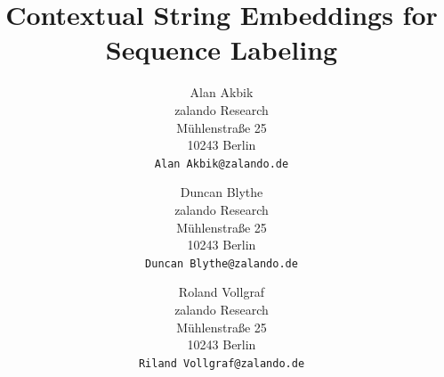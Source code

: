 \documentclass[10pt,twocolumn,letterpaper]{article}
\begin{document}
\title{Contextual String Embeddings for Sequence Labeling}
\author{Alan Akbik\\
zalando Research\\
Mühlenstraße 25\\
10243 Berlin\\
{\tt\small Alan Akbik@zalando.de}
\and
Duncan Blythe\\
zalando Research\\
Mühlenstraße 25\\
10243 Berlin\\
{\tt\small Duncan Blythe@zalando.de}
\and
Roland Vollgraf\\
zalando Research\\
Mühlenstraße 25\\
10243 Berlin\\
{\tt\small Riland Vollgraf@zalando.de}
}


\maketitle

\end{document}
